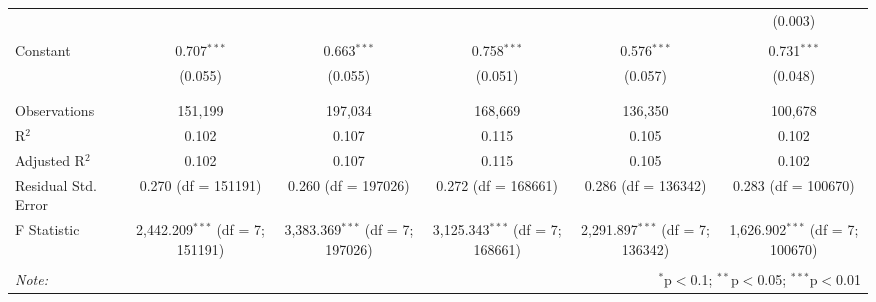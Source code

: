 \begin{table}[!htbp]
\begin{adjustbox}{width=\textwidth}
\begin{tabular}{@{\extracolsep{5pt}}lccccc}
  &  &  &  &  & (0.003) \\ 
  & & & & & \\ 
 Constant & 0.707$^{***}$ & 0.663$^{***}$ & 0.758$^{***}$ & 0.576$^{***}$ & 0.731$^{***}$ \\ 
  & (0.055) & (0.055) & (0.051) & (0.057) & (0.048) \\ 
  & & & & & \\ 
\hline \\[-1.8ex] 
Observations & 151,199 & 197,034 & 168,669 & 136,350 & 100,678 \\ 
R$^{2}$ & 0.102 & 0.107 & 0.115 & 0.105 & 0.102 \\ 
Adjusted R$^{2}$ & 0.102 & 0.107 & 0.115 & 0.105 & 0.102 \\ 
Residual Std. Error & 0.270 (df = 151191) & 0.260 (df = 197026) & 0.272 (df = 168661) & 0.286 (df = 136342) & 0.283 (df = 100670) \\ 
F Statistic & 2,442.209$^{***}$ (df = 7; 151191) & 3,383.369$^{***}$ (df = 7; 197026) & 3,125.343$^{***}$ (df = 7; 168661) & 2,291.897$^{***}$ (df = 7; 136342) & 1,626.902$^{***}$ (df = 7; 100670) \\ 
\hline 
\hline \\[-1.8ex] 
\textit{Note:}  & \multicolumn{5}{r}{$^{*}$p$<$0.1; $^{**}$p$<$0.05; $^{***}$p$<$0.01} \\ 
\end{tabular} 
\end{adjustbox}
\end{table} 
